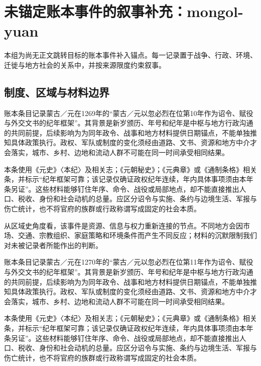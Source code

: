 \section{未锚定账本事件的叙事补充：mongol-yuan}

\label{sec:anchor-batch-two-mongol-yuan}

本组为尚无正文跳转目标的账本事件补入锚点。每一记录置于战争、行政、环境、迁徙与地方社会的关系中，并按来源限度约束叙事。

\subsection{制度、区域与材料边界}

账本条目记录蒙古／元在1269年的“蒙古／元以忽必烈在位第10年作为诏令、赋役与外交文书的纪年框架”。其背景是新岁颁历、年号和纪年是中枢与地方行政沟通的共同前提，后续影响为为同年政令、战事和地方材料提供日期锚点，不能单独推知具体政策执行。政权、军队或制度的变化须经由道路、文书、资源和地方中介才会落实，城市、乡村、边地和流动人群不可能在同一时间承受相同结果。

本条使用《元史》〈本纪〉及相关志；《元朝秘史》；《元典章》或《通制条格》相关条，并标示“纪年框架可靠；该记录仅确证政权纪年连续，年内具体事项须由本年条另证”。这些材料能够钉住年序、命令、战役或局部地点，却不能直接推出人口、税收、身份和社会动机的总量。应区分诏令与实施、条约与边境生活、军报与伤亡统计，也不将官府的族群或行政称谓写成固定的社会本质。

从区域史角度看，该事件是资源、信息与权力重新连接的节点。不同地方会因市场、交通、宗教组织、家庭策略和环境条件而产生不同反应；材料的沉默限制我们对未被记录者所能作出的判断。

账本条目记录蒙古／元在1270年的“蒙古／元以忽必烈在位第11年作为诏令、赋役与外交文书的纪年框架”。其背景是新岁颁历、年号和纪年是中枢与地方行政沟通的共同前提，后续影响为为同年政令、战事和地方材料提供日期锚点，不能单独推知具体政策执行。政权、军队或制度的变化须经由道路、文书、资源和地方中介才会落实，城市、乡村、边地和流动人群不可能在同一时间承受相同结果。

本条使用《元史》〈本纪〉及相关志；《元朝秘史》；《元典章》或《通制条格》相关条，并标示“纪年框架可靠；该记录仅确证政权纪年连续，年内具体事项须由本年条另证”。这些材料能够钉住年序、命令、战役或局部地点，却不能直接推出人口、税收、身份和社会动机的总量。应区分诏令与实施、条约与边境生活、军报与伤亡统计，也不将官府的族群或行政称谓写成固定的社会本质。

